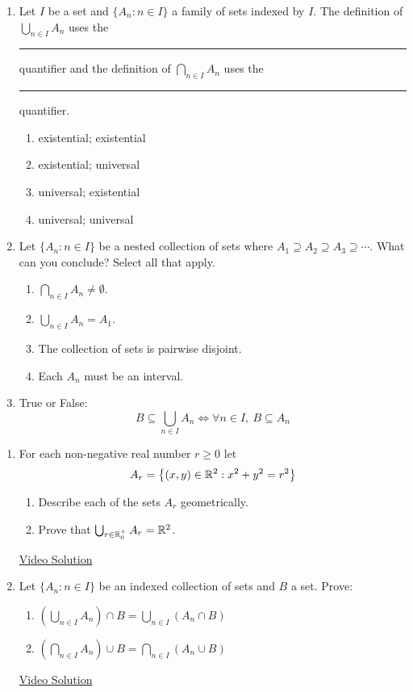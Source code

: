 \pagestyle{empty}


\begin{enumerate}
	\item Let $I$ be a set and $\{A_n:n\in I\}$ a family of sets indexed by $I$. The definition of $\bigcup_{n\in I} A_n$ uses the \rule{2.5cm}{0.15mm} quantifier and the definition of $\bigcap_{n \in I} A_n$ uses the \rule{2.5cm}{0.15mm} quantifier.
	\begin{enumerate}
    \item existential; existential
    \item existential; universal
    \item universal; existential
    \item universal; universal
	\end{enumerate}

	\item Let $\{A_n:n\in I\}$ be a nested collection of sets where $A_1\supseteq A_2\supseteq A_3\supseteq\cdots$. What can you conclude? Select all that apply.
	\begin{enumerate}
    \item $\bigcap_{n \in I} A_n \neq \emptyset$.
    \item $\bigcup_{n \in I} A_n = A_1$.
    \item The collection of sets is pairwise disjoint.
    \item Each $A_n$ must be an interval.
	\end{enumerate}

	\item True or False:
	\[
    B\subseteq \bigcup_{n\in I}A_n\iff \forall n\in I,\ B\subseteq A_n
	\]
\end{enumerate}



\begin{enumerate}
	\item For each non-negative real number $r\ge 0$ let 
  \[
  	A_r=\big\{(x,y)\in\mathbb{R}^2:x^2+y^2=r^2\big\}
  \]
	\begin{enumerate}
  	\item Describe each of the sets $A_r$ geometrically.
  	\item Prove that $\bigcup_{r\in\mathbb{R}^+_0}A_r=\mathbb{R}^2$.
	\end{enumerate}
		
	\href{https://youtu.be/WuSucjuxjbU}{Video Solution}
		
	\item Let $\{A_n : n \in I\}$ be an indexed collection of sets and $B$ a set. Prove:
	\begin{enumerate}
    \item $\displaystyle \left(\bigcup_{n\in I} A_n\right) \cap B = \bigcup_{n\in I} (A_n\cap B)$
    \item $\displaystyle \left(\bigcap_{n\in I} A_n\right) \cup B = \bigcap_{n\in I} (A_n\cup B)$
	\end{enumerate}

	\href{https://youtu.be/CtIg2lrsyAs}{Video Solution}
\end{enumerate}

